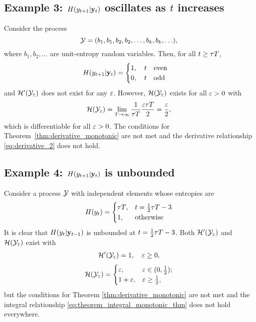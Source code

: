 \documentclass[12pt, draftclsnofoot,journal,onecolumn]{IEEEtran}
\begin{document}
{\subsection*{Example 3: $H(y_{t+1}|{\mathbf{y}}_{t})$ oscillates as $t$ increases}
Consider the process
\begin{equation}
    \mathcal{Y}= (b_1,b_1,b_2,b_2,\ldots,b_{k},b_{k},\ldots),
    \label{eq:oscillation_eg_def}
\end{equation}
where $b_1,b_2,\ldots$ are \iid unit-entropy random variables. Then, for all $t\geq {\tau T}$,
\begin{equation*}
    H(y_{t+1}|{\mathbf{y}}_{t}) = \begin{cases}
      1, \quad  t \quad\text{even} \\
      0, \quad t \quad\text{odd }
   \end{cases}
\end{equation*}
and ${\mathcal{H}{'}}(\mathcal{Y}_\varepsilon)$ does not exist for any $\varepsilon$. However, $\mathcal{H}(\mathcal{Y}_\varepsilon)$ exists for all $\varepsilon>0$ with
\begin{align}
    \mathcal{H}(\mathcal{Y}_\varepsilon)=\lim_{T\to\infty}\frac{1}{{\tau T}}\frac{{\varepsilon {\tau T}}}{2}=\frac{\varepsilon}{2},
    \label{eq:osc_eg_EntR}
\end{align}
which is differentiable for all $\varepsilon>0$. The conditions for Theorem~\ref{thm:derivative_monotonic} are not met and the derivative relationship \eqref{eq:derivative_2} does not hold.

\subsection*{Example 4: $H(y_{t+1}|{\mathbf{y}}_{t})$ is unbounded}
Consider a process $\mathcal{Y}$ with independent elements whose entropies are
\begin{equation}
    H(y_t) = \begin{cases}
      {\tau T}, & t=\frac{1}{2}{\tau T}-3\\
      1, & \text{otherwise}
   \end{cases}
   \label{eq:unbounded_eg}
\end{equation}
It is clear that $H(y_t|{\mathbf{y}}_{t-1})$ is unbounded at $t=\frac{1}{2}{\tau T}-3$. Both ${\mathcal{H}{'}}(\mathcal{Y}_\varepsilon)$ and $\mathcal{H}(\mathcal{Y}_\varepsilon)$ exist with
\begin{align*}
    {\mathcal{H}{'}}(\mathcal{Y}_\varepsilon) = 1,\quad\varepsilon\geq 0,
\end{align*}
\begin{equation}
    \mathcal{H}(\mathcal{Y}_\varepsilon) = \begin{cases}
      \varepsilon, & \varepsilon\in(0,\frac{1}{2}); \\
      1+\varepsilon, & \varepsilon\geq \frac{1}{2},
   \end{cases}
\end{equation}
but the conditions for Theorem \ref{thm:derivative_monotonic} are not met and the integral relationship \eqref{eq:theorem_integral_monotonic_thm} does not hold everywhere.

}
\end{document}
